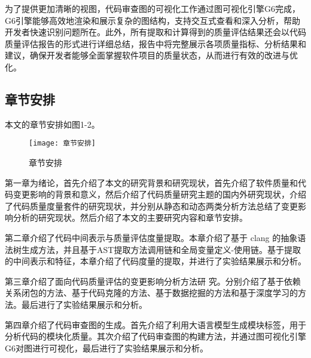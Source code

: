 为了提供更加清晰的视图，代码审查图的可视化工作通过图可视化引擎G6完成，G6引擎能够高效地渲染和展示复杂的图结构，支持交互式查看和深入分析，帮助开发者快速识别问题所在。此外，所有提取和计算得到的质量评估结果还会以代码质量评估报告的形式进行详细总结，报告中将完整展示各项质量指标、分析结果和建议，确保开发者能够全面掌握软件项目的质量状态，从而进行有效的改进与优化。

\subsection{章节安排}

本文的章节安排如图1-2。

\begin{figure}[h]
\centering
\texttt{[image: 章节安排]}
\caption{章节安排}
\end{figure}

第一章为绪论，首先介绍了本文的研究背景和研究现状，首先介绍了软件质量和代码变更影响的背景和意义，然后介绍了代码质量研究主题的国内外研究现状，介绍了代码质量度量套件的研究现状，并分别从静态和动态两类分析方法总结了变更影响分析的研究现状。然后介绍了本文的主要研究内容和章节安排。

第二章介绍了代码中间表示与质量评估度量提取。本章介绍了基于 clang 的抽象语法树生成方法，并且基于AST提取方法调用链和全局变量定义-使用链。基于提取的中间表示和特征，本章介绍了代码度量的提取，并进行了实验结果展示和分析。

第三章介绍了面向代码质量评估的变更影响分析方法研
究。分别介绍了基于依赖关系闭包的方法、基于代码克隆的方法、基于数据挖掘的方法和基于深度学习的方法。最后进行了实验结果展示和分析。

第四章介绍了代码审查图的生成。首先介绍了利用大语言模型生成模块标签，用于分析代码的模块化质量。其次介绍了代码审查图的构建方法，并通过图可视化引擎G6对图进行可视化，最后进行了实验结果展示和分析。



